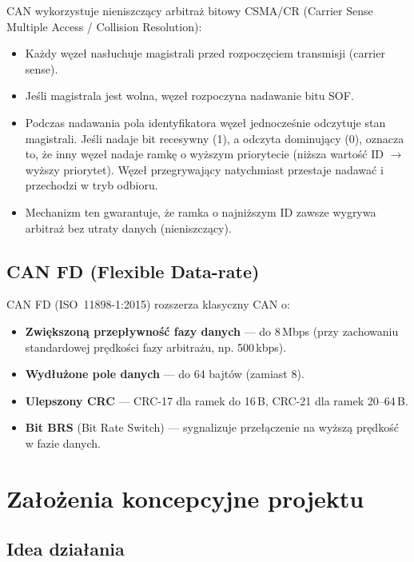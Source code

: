 \documentclass[12pt, a4paper]{article}
\begin{document}
CAN wykorzystuje nieniszczący arbitraż bitowy CSMA/CR
(Carrier Sense Multiple Access / Collision Resolution):
\begin{itemize}
  \item Każdy węzeł nasłuchuje magistrali przed rozpoczęciem transmisji
        (carrier sense).
  \item Jeśli magistrala jest wolna, węzeł rozpoczyna nadawanie bitu SOF.
  \item Podczas nadawania pola identyfikatora węzeł jednocześnie odczytuje
        stan magistrali. Jeśli nadaje bit recesywny (1), a odczyta dominujący (0),
        oznacza to, że inny węzeł nadaje ramkę o wyższym priorytecie
        (niższa wartość ID $\to$ wyższy priorytet). Węzeł przegrywający
        natychmiast przestaje nadawać i przechodzi w tryb odbioru.
  \item Mechanizm ten gwarantuje, że ramka o najniższym ID zawsze wygrywa
        arbitraż bez utraty danych (nieniszczący).
\end{itemize}

\subsection{CAN FD (Flexible Data-rate)}

CAN FD (ISO~11898-1:2015) rozszerza klasyczny CAN o:
\begin{itemize}
  \item \textbf{Zwiększoną przepływność fazy danych} --- do 8\,Mbps
        (przy zachowaniu standardowej prędkości fazy arbitrażu, np. 500\,kbps).
  \item \textbf{Wydłużone pole danych} --- do 64 bajtów (zamiast 8).
  \item \textbf{Ulepszony CRC} --- CRC-17 dla ramek do 16\,B,
        CRC-21 dla ramek 20--64\,B.
  \item \textbf{Bit BRS} (Bit Rate Switch) --- sygnalizuje przełączenie
        na wyższą prędkość w fazie danych.
\end{itemize}

\section{Założenia koncepcyjne projektu}

\subsection{Idea działania}
\end{document}
